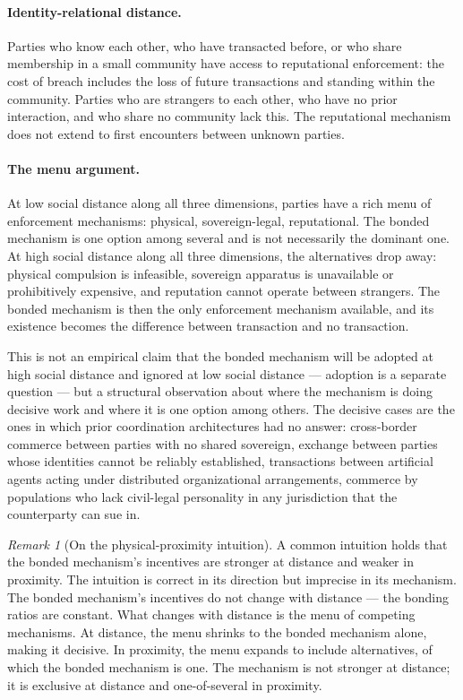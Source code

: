 \documentclass[11pt,a4paper]{article}
\theoremstyle{remark}
\newtheorem{remark}{Remark}[section]
\begin{document}
\paragraph{Identity-relational distance.}
Parties who know each other, who have transacted before, or who
share membership in a small community have access to reputational
enforcement: the cost of breach includes the loss of future
transactions and standing within the community. Parties who are
strangers to each other, who have no prior interaction, and who
share no community lack this. The reputational mechanism does
not extend to first encounters between unknown parties.

\paragraph{The menu argument.}
At low social distance along all three dimensions, parties have
a rich menu of enforcement mechanisms: physical, sovereign-legal,
reputational. The bonded mechanism is one option among several
and is not necessarily the dominant one. At high social distance
along all three dimensions, the alternatives drop away: physical
compulsion is infeasible, sovereign apparatus is unavailable or
prohibitively expensive, and reputation cannot operate between
strangers. The bonded mechanism is then the only enforcement
mechanism available, and its existence becomes the difference
between transaction and no transaction.

This is not an empirical claim that the bonded mechanism will be
adopted at high social distance and ignored at low social
distance --- adoption is a separate question --- but a structural
observation about where the mechanism is doing decisive work and
where it is one option among others. The decisive cases are the
ones in which prior coordination architectures had no answer:
cross-border commerce between parties with no shared sovereign,
exchange between parties whose identities cannot be reliably
established, transactions between artificial agents acting under
distributed organizational arrangements, commerce by
populations who lack civil-legal personality in any jurisdiction
that the counterparty can sue in.

\begin{remark}[On the physical-proximity intuition]
A common intuition holds that the bonded mechanism's incentives
are stronger at distance and weaker in proximity. The intuition
is correct in its direction but imprecise in its mechanism. The
bonded mechanism's incentives do not change with distance ---
the bonding ratios are constant. What changes with distance is
the menu of competing mechanisms. At distance, the menu shrinks
to the bonded mechanism alone, making it decisive. In proximity,
the menu expands to include alternatives, of which the bonded
mechanism is one. The mechanism is not stronger at distance; it
is exclusive at distance and one-of-several in proximity.
\end{remark}
\end{document}
